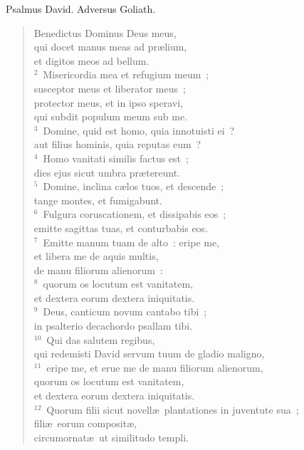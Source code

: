 \lettrine[lines=3,image=true,loversize=0.05,lraise=-0.03]{P}{}salmus David. Adversus Goliath. \begin{flushleft}\begin{verse}\vspace{6pt}Benedictus Dominus Deus meus,\\ qui docet manus meas ad pr\ae lium,\\ et digitos meos ad bellum.\\
${}^{2}$~Misericordia mea et refugium meum~;\\ susceptor meus et liberator meus~;\\ protector meus, et in ipso speravi,\\ qui subdit populum meum sub me.\\
${}^{3}$~Domine, quid est homo, quia innotuisti ei~?\\ aut filius hominis, quia reputas eum~?\\
${}^{4}$~Homo vanitati similis factus est~;\\ dies ejus sicut umbra pr\ae tereunt.\\
${}^{5}$~Domine, inclina c\ae los tuos, et descende~;\\ tange montes, et fumigabunt.\\
${}^{6}$~Fulgura coruscationem, et dissipabis eos~;\\ emitte sagittas tuas, et conturbabis eos.\\
${}^{7}$~Emitte manum tuam de alto~: eripe me,\\ et libera me de aquis multis,\\ de manu filiorum alienorum~:\\
${}^{8}$~quorum os locutum est vanitatem,\\ et dextera eorum dextera iniquitatis.\\
${}^{9}$~Deus, canticum novum cantabo tibi~;\\ in psalterio decachordo psallam tibi.\\
${}^{10}$~Qui das salutem regibus,\\ qui redemisti David servum tuum de gladio maligno,\\
${}^{11}$~eripe me, et erue me de manu filiorum alienorum,\\ quorum os locutum est vanitatem,\\ et dextera eorum dextera iniquitatis.\\
${}^{12}$~Quorum filii sicut novell\ae\ plantationes in juventute sua~;\\ fili\ae\ eorum composit\ae ,\\ circumornat\ae\ ut similitudo templi.\\

\end{verse}
\end{flushleft}
